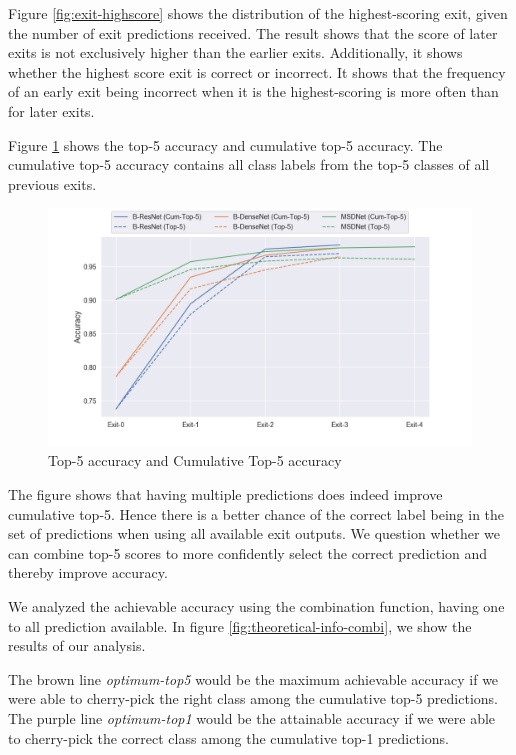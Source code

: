 Figure \ref{fig:exit-highscore} shows the distribution of the highest-scoring exit, given the number of exit predictions received. The result shows that the score of later exits is not exclusively higher than the earlier exits. Additionally, it shows whether the highest score exit is correct or incorrect. It shows that the frequency of an early exit being incorrect when it is the highest-scoring is more often than for later exits.

Figure \ref{fig:top-5-cumulative}  shows the top-5 accuracy and cumulative top-5 accuracy. The cumulative top-5 accuracy contains all class labels from the top-5 classes of all previous exits. 
\begin{figure}
	\centering
	\includegraphics[width=.8\linewidth]{figures/edge/top5cumulative}
	\caption[Top-5 accuracy and Cumulative Top-5 accuracy]{Top-5 accuracy and Cumulative Top-5 accuracy}
	\label{fig:top-5-cumulative}
\end{figure}

The figure shows that having multiple predictions does indeed improve cumulative top-5. Hence there is a better chance of the correct label being in the set of predictions when using all available exit outputs. We question whether we can combine top-5 scores to more confidently select the correct prediction and thereby improve accuracy. 

We analyzed the achievable accuracy using the combination function, having one to all prediction available. In figure \ref{fig:theoretical-info-combi}, we show the results of our analysis.  

The brown line \textit{optimum-top5} would be the maximum achievable accuracy if we were able to cherry-pick the right class among the cumulative top-5 predictions. The purple line \textit{optimum-top1} would be the attainable accuracy if we were able to cherry-pick the correct class among the cumulative top-1 predictions.

